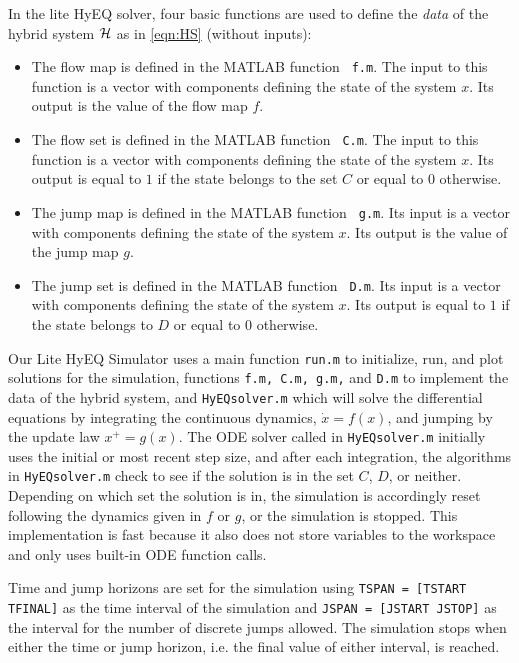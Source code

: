 \documentclass{article}
\begin{document}
In the lite HyEQ solver, four basic functions are used to define the {\em data} of the hybrid system $\mathcal{H}$
as in \eqref{eqn:HS} (without inputs):
\begin{itemize}
\item The flow map is defined in the MATLAB function {\tt
f.m}. The input to this function is a vector with components defining the state of the system $x$. Its output is the value of the flow map $f$.
\item The flow set is defined in the MATLAB function {\tt
C.m}. The input to this function is a vector with components defining the state of the system $x$. Its output is equal to $1$ if the state belongs to the set $C$ or equal to $0$ otherwise.
\item The jump map is defined in the MATLAB function {\tt
g.m}. Its input is a vector with components defining the state of the system $x$. Its output is the value of the jump map $g$.
\item The jump set is defined in the MATLAB function {\tt
D.m}. Its input is a vector with components defining the state of the system $x$. Its output is equal to $1$ if the state belongs to $D$ or equal to $0$ otherwise.
\end{itemize}

Our Lite HyEQ Simulator uses a main function {\tt run.m} to initialize, run, and plot solutions for the simulation, functions {\tt f.m, C.m, g.m,} and {\tt D.m} to implement the data of the hybrid system, and {\tt HyEQsolver.m} which will solve the differential equations by integrating the continuous dynamics, $\dot{x}=f(x)$, and jumping by the update law $x^+ = g(x)$. The ODE solver called in {\tt HyEQsolver.m} initially uses the initial or most recent step size, and after each integration, the algorithms in {\tt HyEQsolver.m} check to see if the solution is in the set $C$, $D$, or neither. Depending on which set the solution is in, the simulation is accordingly reset following the dynamics given in $f$ or $g$, or the simulation is stopped. This implementation is fast because it also does not store variables to the workspace and only uses built-in ODE function calls.

Time and jump horizons are set for the simulation using {\tt TSPAN = [TSTART TFINAL]} as the time interval of the simulation and {\tt JSPAN = [JSTART \hspace{2mm} JSTOP]} as the interval for the number of discrete jumps allowed. The simulation stops when either the time or jump horizon, i.e. the final value of either interval, is reached.
\end{document}
